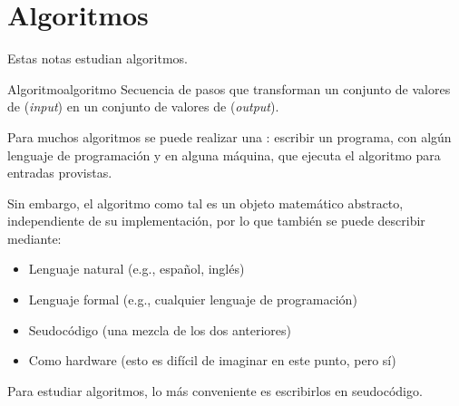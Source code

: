\section{Algoritmos}

Estas notas estudian algoritmos.

\begin{definicion}{Algoritmo}{algoritmo}
Secuencia de pasos que transforman un conjunto de valores de  (\textit{input}) en un conjunto de valores de  (\textit{output}).
\end{definicion}

Para muchos algoritmos se puede realizar una : escribir un programa, con algún lenguaje de programación y en alguna máquina, que ejecuta el algoritmo para entradas provistas. 

Sin embargo, el algoritmo como tal es un objeto matemático abstracto, independiente de su implementación, por lo que también se puede describir mediante:
\begin{itemize}
  \item Lenguaje natural (e.g., español, inglés)
  \item Lenguaje formal (e.g., cualquier lenguaje de programación)
  \item Seudocódigo (una mezcla de los dos anteriores)
  \item Como hardware (esto es difícil de imaginar en este punto, pero sí)
\end{itemize}

Para estudiar algoritmos, lo más conveniente es escribirlos en seudocódigo.
